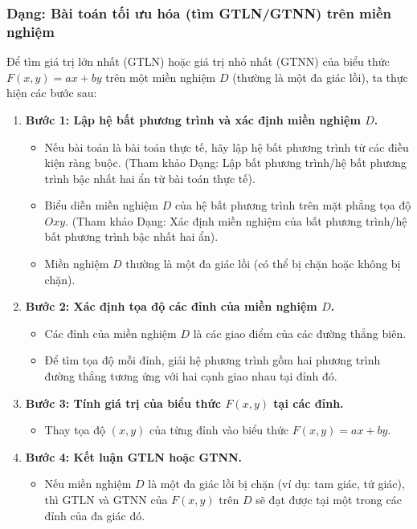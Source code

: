 \subsubsection{Dạng: Bài toán tối ưu hóa (tìm GTLN/GTNN) trên miền nghiệm}
\begin{phuongphap}
Để tìm giá trị lớn nhất (GTLN) hoặc giá trị nhỏ nhất (GTNN) của biểu thức $F(x, y) = ax + by$ trên một miền nghiệm $D$ (thường là một đa giác lồi), ta thực hiện các bước sau:
\begin{enumerate}
    \item \textbf{Bước 1: Lập hệ bất phương trình và xác định miền nghiệm $D$.}
    \begin{itemize}
        \item Nếu bài toán là bài toán thực tế, hãy lập hệ bất phương trình từ các điều kiện ràng buộc. (Tham khảo Dạng: Lập bất phương trình/hệ bất phương trình bậc nhất hai ẩn từ bài toán thực tế).
        \item Biểu diễn miền nghiệm $D$ của hệ bất phương trình trên mặt phẳng tọa độ $Oxy$. (Tham khảo Dạng: Xác định miền nghiệm của bất phương trình/hệ bất phương trình bậc nhất hai ẩn).
        \item Miền nghiệm $D$ thường là một đa giác lồi (có thể bị chặn hoặc không bị chặn).
    \end{itemize}
    \item \textbf{Bước 2: Xác định tọa độ các đỉnh của miền nghiệm $D$.}
    \begin{itemize}
        \item Các đỉnh của miền nghiệm $D$ là các giao điểm của các đường thẳng biên.
        \item Để tìm tọa độ mỗi đỉnh, giải hệ phương trình gồm hai phương trình đường thẳng tương ứng với hai cạnh giao nhau tại đỉnh đó.
    \end{itemize}
    \item \textbf{Bước 3: Tính giá trị của biểu thức $F(x, y)$ tại các đỉnh.}
    \begin{itemize}
        \item Thay tọa độ $(x, y)$ của từng đỉnh vào biểu thức $F(x, y) = ax + by$.
    \end{itemize}
    \item \textbf{Bước 4: Kết luận GTLN hoặc GTNN.}
    \begin{itemize}
        \item Nếu miền nghiệm $D$ là một đa giác lồi bị chặn (ví dụ: tam giác, tứ giác), thì GTLN và GTNN của $F(x, y)$ trên $D$ sẽ đạt được tại một trong các đỉnh của đa giác đó.

\end{itemize}
\end{enumerate}
\end{phuongphap}
